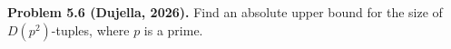 \textbf{Problem 5.6 (Dujella, 2026).} Find an absolute upper bound for the size of $D(p^2)$-tuples, where $p$ is a prime.
